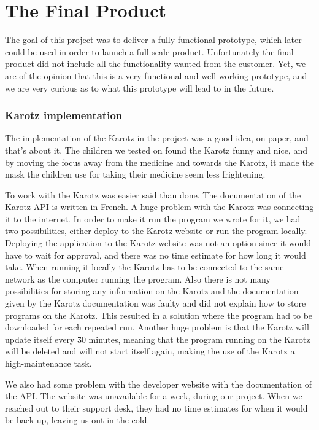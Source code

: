 \section{The Final Product}
\label{sec:finalproduct}
The goal of this project was to deliver a fully functional prototype, which later could be used in order to launch a full-scale product. Unfortunately the final product did not include all the functionality wanted from the customer. Yet, we are of the opinion that this is a very functional and well working prototype, and we are very curious as to what this prototype will lead to in the future. 

\subsubsection{Karotz implementation}
The implementation of the Karotz in the project was a good idea, on paper, and that's about it. The children we tested on found the Karotz funny and nice, and by moving the focus away from the medicine and towards the Karotz, it made the mask the children use for taking their medicine seem less frightening. 

To work with the Karotz was easier said than done. The documentation of the Karotz API is written in French. 
A huge problem with the Karotz was connecting it to the internet. In order to make it run the program we wrote for it, we had two possibilities, either deploy to the Karotz website or run the program locally. Deploying the application to the Karotz website was not an option since it would have to wait for approval, and there was no time estimate for how long it would take. When running it locally the Karotz has to be connected to the same network as the computer running the program. Also there is not many possibilities for storing any information on the Karotz and the documentation given by the Karotz documentation was faulty and did not explain how to store programs on the Karotz. This resulted in a solution where the program had to be downloaded for each repeated run. Another huge problem is that the Karotz will update itself every \~ 30 minutes, meaning that the program running on the Karotz will be deleted and will not start itself again, making the use of the Karotz a high-maintenance task. 

We also had some problem with the developer website with the documentation of the API. The website was unavailable for a week, during our project. When we reached out to their support desk, they had no time estimates for when it would be back up, leaving us out in the cold. 

